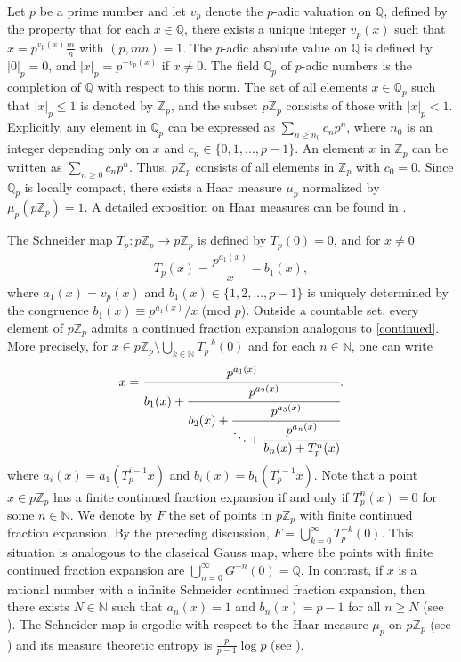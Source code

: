 \documentclass[11pt]{amsart}
\theoremstyle{remark}
\numberwithin{equation}{section}
\newcommand{\N}{\mathbb{N}}
\newcommand{\Q}{\mathbb{Q}}
\newcommand{\Z}{\mathbb{Z}}
\newcommand{\Zp}{\mathbb{Z}_p}
\begin{document}
Let $p$ be a prime number and let $v_p$ denote the $p$-adic valuation on $\Q$, defined by the property that for each $x\in \Q$, there exists a unique integer
$v_p(x)$ such that $x=p^{v_p(x)}\frac{m}{n}$ with $(p,mn)=1$. The $p$-adic absolute value on $\Q$ is defined by $|0|_p=0$, and $|x|_p=p^{-v_p(x)}$ if $x\neq 0$. The field $\Q_p$ of $p$-adic numbers is the completion of $\Q$ with respect to this norm. The set of all elements $x\in \Q_p$ such that $|x|_p\leq 1$ is denoted by $\Z_p$, and the subset $p\Z_p$ consists of those with $|x|_p<1$. Explicitly, any element in $\Q_p$ can be expressed as $\sum_{n\geq n_0}c_np^{n}$, where $n_0$ is an integer depending only on $x$ and $c_n\in \{0,1,...,p-1\}$. An element $x$ in $\Z_p$ can be written as $\sum_{n\geq0} c_np^n$. Thus, $p\Zp$ consists of all elements in $\Z_p$ with $c_0=0.$ 
Since $\Q_p$ is locally compact, there exists a Haar measure $\mu_p$ normalized by $\mu_{p}(p\Z_p)=1$. A detailed exposition on Haar measures can be found in \cite{folland}.


The Schneider map $T_{p}:p\Z_{p}\rightarrow p\Z_{p}$ is defined by $T_{p}(0)=0$, and for $x\neq 0$
  \begin{align*}
      T_{p}(x)=\dfrac{p^{a_{1}(x)}}{x}-b_{1}(x),
  \end{align*} where $a_{1}(x)=v_{p}(x)$ and $b_1(x)\in\{1,2,...,p-1\}$ is uniquely determined by the congruence $b_{1}(x)\equiv p^{a_{1}(x)}/x$ (mod $p$). Outside a countable set, every element of $p\Z_p$ admits a continued fraction expansion analogous to \eqref{continued}. More precisely, for $x\in p\Z_{p}\setminus \bigcup_{k\in \N} T_p^{-k}(0)$ and for each $n\in \N$, one can write
  \begin{align}\label{SchneiderContinued}
      x= \cfrac{p^{a_{1}(x)}}{b_{1}(x)+\cfrac{p^{a_{2}(x)}}{b_{2}(x)+\cfrac{p^{a_{3}(x)}}{\ddots + \cfrac{p^{a_{n}(x)}}{b_{n}(x)+T_{p}^n(x)}}}}.
  \end{align}
where $a_{i}(x)=a_{1}(T^{i-1}_{p}x)$ and $b_{i}(x)=b_{1}(T^{i-1}_{p}x)$.  Note that a point $x\in p\Zp$ has a finite continued fraction expansion if and only if $T^{n}_{p}(x)=0$ for some $n\in \N$. We denote by $F$ the set of points in $p\Z_p$ with finite continued fraction expansion. By the preceding discussion, $F=\bigcup_{k=0}^\infty T_p^{-k}(0)$. This situation is analogous to the classical Gauss map, where the points with finite continued fraction expansion are $\bigcup^{\infty}_{n=0}G^{-n}(0)=\Q$. In contrast, if $x$ is a rational number with a infinite Schneider continued fraction expansion, then there exists $N\in \N$ such that $a_{n}(x)=1$ and $b_{n}(x)=p-1$ for all $n\geq N$ (see  \cite[Theorem 1]{hw}). 
 The Schneider map is ergodic with respect to the Haar measure $\mu_p$  on $p\Z_p$ (see \cite[Lemma 2]{hw}) and its measure theoretic entropy is $\frac{p}{p-1}\log p $ (see \cite{hn}).
\end{document}
